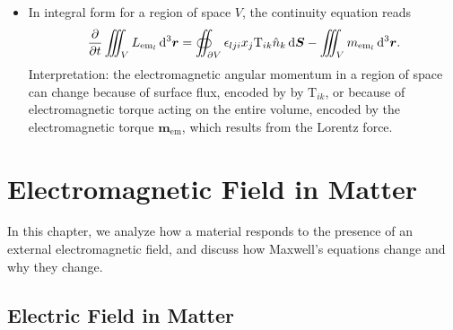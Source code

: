 \documentclass[11pt, a4paper]{article}
\newcommand{\diff}{\mathop{}\!\mathrm{d}} %
\newcommand{\dr}{\diff^{3} \r}  %
\renewcommand{\vec}[1]{\bm{#1}} %
\renewcommand{\r}{\vec{r}}
\newcommand{\TT}{\mathrm{T}}  %
\newcommand{\e}{\epsilon}
\begin{document}
\begin{itemize}
	\item In integral form for a region of space $ V $, the continuity equation reads
	\begin{equation*}
		\pdv{t}\iiint_{V} L_{\text{em}_{l}}\dr  = \oiint_{\partial V}\e_{lji}x_{j}\TT_{ik}\hat{n}_{k}\diff \vec{S} - \iiint_{V} m_{\text{em}_{l}}\dr.
	\end{equation*}
	Interpretation: the electromagnetic angular momentum in a region of space can change because of surface flux, encoded by by $ \TT_{ik} $, or because of electromagnetic torque acting on the entire volume, encoded by the electromagnetic torque $ \vec{m}_{\text{em}} $, which results from the Lorentz force.
\end{itemize}

\newpage
\section{Electromagnetic Field in Matter}
In this chapter, we analyze how a material responds to the presence of an external electromagnetic field, and discuss how Maxwell's equations change and why they change. 

\subsection{Electric Field in Matter}
\end{document}
